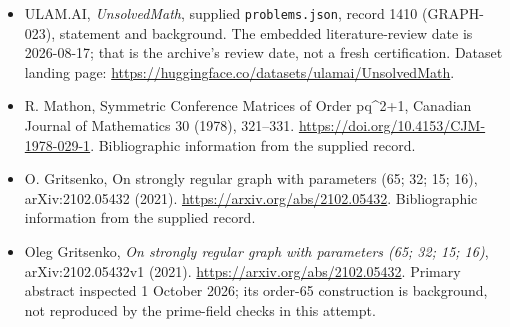 \documentclass[11pt,a4paper]{article}
\begin{document}
{\small

\begin{itemize}

\item[\hypertarget{source:1410:1}{S1}] ULAM.AI, \emph{UnsolvedMath}, supplied \texttt{problems.json}, record 1410 (GRAPH-023), statement and background. The embedded literature-review date is 2026-08-17; that is the archive’s review date, not a fresh certification. Dataset landing page: \url{https://huggingface.co/datasets/ulamai/UnsolvedMath}.

\item[\hypertarget{source:1410:2}{S2}] R. Mathon, Symmetric Conference Matrices of Order pq\textasciicircum{}2+1, Canadian Journal of Mathematics 30 (1978), 321–331. \url{https://doi.org/10.4153/CJM-1978-029-1}. Bibliographic information from the supplied record.

\item[\hypertarget{source:1410:3}{S3}] O. Gritsenko, On strongly regular graph with parameters (65; 32; 15; 16), arXiv:2102.05432 (2021). \url{https://arxiv.org/abs/2102.05432}. Bibliographic information from the supplied record.


\item[E1] Oleg Gritsenko, \emph{On strongly regular graph with
parameters (65; 32; 15; 16)}, arXiv:2102.05432v1 (2021).
\url{https://arxiv.org/abs/2102.05432}. Primary abstract inspected
1 October 2026; its order-65 construction is background, not reproduced
by the prime-field checks in this attempt.

\end{itemize}

}

\label{end:1410}
\end{document}
